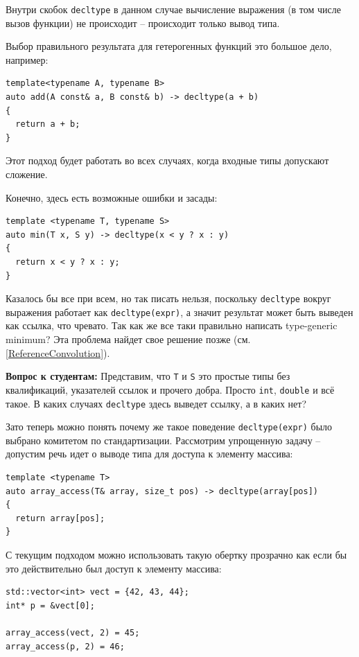 \documentclass[a4paper,12pt,oneside]{book}
\newif\ifanswers
\begin{document}
Внутри скобок \lstinline!decltype! в данном случае вычисление выражения (в том числе вызов функции) не происходит -- происходит только вывод типа.

Выбор правильного результата для гетерогенных функций это большое дело, например:

\begin{lstlisting}
template<typename A, typename B> 
auto add(A const& a, B const& b) -> decltype(a + b) 
{ 
  return a + b; 
}
\end{lstlisting}

Этот подход будет работать во всех случаях, когда входные типы допускают сложение.

Конечно, здесь есть возможные ошибки и засады:

\begin{lstlisting}
template <typename T, typename S>
auto min(T x, S y) -> decltype(x < y ? x : y) 
{
  return x < y ? x : y;
}
\end{lstlisting}

Казалось бы все при всем, но так писать нельзя, поскольку \lstinline!decltype! вокруг выражения работает как \lstinline!decltype(expr)!, а значит результат может быть выведен как ссылка, что чревато. Так как же все таки правильно написать type-generic minimum? Эта проблема найдет свое решение позже (см. \ref{ReferenceConvolution}).

\textbf{Вопрос к студентам:} Представим, что \lstinline!T! и \lstinline!S! это простые типы без квалификаций, указателей ссылок и прочего добра. Просто  \lstinline!int!, \lstinline!double! и всё такое. В каких случаях  \lstinline!decltype! здесь выведет ссылку, а в каких нет? 

\ifanswers
Правильный ответ: ссылка будет если типы одинаковые. Если они разные, все будет хорошо.
\fi

Зато теперь можно понять почему же такое поведение \lstinline!decltype(expr)! было выбрано комитетом по стандартизации. Рассмотрим упрощенную задачу -- допустим речь идет о выводе типа для доступа к элементу массива:

\begin{lstlisting}
template <typename T>
auto array_access(T& array, size_t pos) -> decltype(array[pos]) 
{
  return array[pos];
}
\end{lstlisting}

С текущим подходом можно использовать такую обертку прозрачно как если бы это действительно был доступ к элементу массива:

\begin{lstlisting}
std::vector<int> vect = {42, 43, 44};
int* p = &vect[0];

array_access(vect, 2) = 45;
array_access(p, 2) = 46;
\end{lstlisting}
\end{document}

